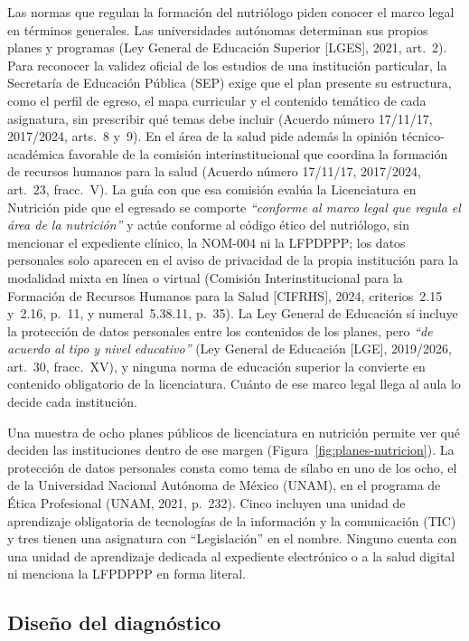 \documentclass[12pt, a4paper]{article}
\begin{document}
Las normas que regulan la formación del nutriólogo piden conocer el
marco legal en términos generales. Las universidades autónomas
determinan sus propios planes y programas (Ley General de Educación
Superior [LGES], 2021, art.~2). Para reconocer la validez oficial de
los estudios de una institución particular, la Secretaría de Educación
Pública (SEP) exige que el plan presente su estructura, como el perfil de
egreso, el mapa curricular y el contenido temático de cada asignatura,
sin prescribir qué temas debe incluir (Acuerdo número 17/11/17,
2017/2024, arts.~8 y~9). En el área de la salud pide además la opinión
técnico-académica favorable de la comisión interinstitucional que
coordina la formación de recursos humanos para la salud (Acuerdo número
17/11/17, 2017/2024, art.~23, fracc.~V). La guía con que esa comisión
evalúa la Licenciatura en Nutrición pide que el egresado se comporte
\textit{``conforme al marco legal que regula el área de la nutrición''} y actúe
conforme al código ético del nutriólogo, sin mencionar el expediente clínico, la NOM-004 ni la LFPDPPP; los datos personales solo
aparecen en el aviso de privacidad de la propia institución para la
modalidad mixta en línea o virtual (Comisión Interinstitucional para la Formación de Recursos Humanos para la Salud [CIFRHS], 2024, criterios~2.15 y~2.16,
p.~11, y numeral~5.38.11, p.~35). La Ley General de Educación sí
incluye la protección de datos personales entre los contenidos de los
planes, pero \textit{``de acuerdo al tipo y nivel educativo''} (Ley General de
Educación [LGE], 2019/2026, art.~30, fracc.~XV), y ninguna norma de
educación superior la convierte en contenido obligatorio de la
licenciatura. Cuánto de ese marco legal llega al aula lo decide cada
institución.
 
Una muestra de ocho planes públicos de licenciatura en nutrición permite
ver qué deciden las instituciones dentro de ese margen
(Figura~\ref{fig:planes-nutricion}). La protección de datos personales
consta como tema de sílabo en uno de los ocho, el de la Universidad Nacional Autónoma de México (UNAM),
en el programa de Ética Profesional
(UNAM, 2021, p.~232). Cinco incluyen una unidad de aprendizaje
obligatoria de tecnologías de la información y la comunicación (TIC) y
tres tienen una asignatura con ``Legislación'' en el nombre. Ninguno
cuenta con una unidad de aprendizaje dedicada al expediente electrónico
o a la salud digital ni menciona la LFPDPPP en forma literal.
 
 
\subsection{Diseño del diagnóstico}
 
\end{document}
